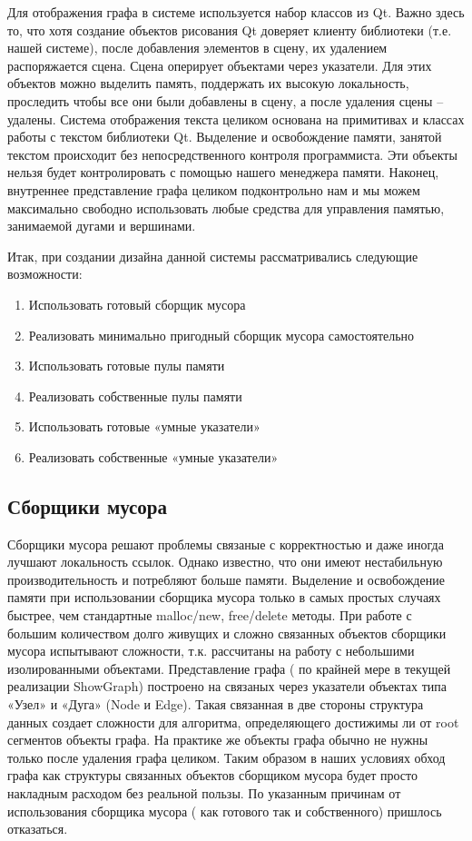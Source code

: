 \documentclass{article}
\begin{document}
Для отображения графа в системе используется набор классов из Qt. Важно здесь то, что хотя создание объектов рисования Qt доверяет клиенту библиотеки (т.е. нашей системе), после добавления элементов в сцену, их удалением распоряжается сцена. Сцена оперирует объектами через указатели. Для этих объектов можно выделить память, поддержать их высокую локальность, проследить чтобы все они были добавлены в сцену, а после удаления сцены -- удалены. Система отображения текста целиком основана на примитивах и классах работы с текстом библиотеки Qt. Выделение и освобождение памяти, занятой текстом происходит без непосредственного контроля программиста. Эти объекты нельзя будет контролировать с помощью нашего менеджера памяти. Наконец, внутреннее представление графа целиком подконтрольно нам и мы можем максимально свободно использовать любые средства для управления памятью, занимаемой дугами и вершинами.

Итак, при создании дизайна данной системы рассматривались следующие возможности:
\begin{enumerate}
\item  Использовать готовый сборщик мусора

\item  Реализовать минимально пригодный сборщик мусора самостоятельно

\item  Использовать готовые пулы памяти

\item  Реализовать собственные пулы памяти

\item  Использовать готовые «умные указатели»

\item  Реализовать собственные «умные указатели»
\end{enumerate}

\subsection{Сборщики мусора}

 Сборщики мусора решают проблемы связаные с корректностью и даже иногда лучшают локальность ссылок. Однако известно, что они имеют нестабильную производительность и потребляют больше памяти. Выделение и освобождение памяти при использовании сборщика мусора только в самых простых случаях быстрее, чем стандартные malloc/new, free/delete методы. При работе с большим количеством долго живущих и сложно связанных объектов сборщики мусора испытывают сложности, т.к. рассчитаны на работу с небольшими изолированными объектами. Представление графа ( по крайней мере в текущей реализации ShowGraph) построено на связаных через указатели объектах типа «Узел» и «Дуга» (Node и Edge). Такая связанная в две стороны структура данных создает сложности для алгоритма, определяющего достижимы ли от root сегментов объекты графа. На практике же объекты графа обычно не нужны только после удаления графа целиком. Таким образом в наших условиях обход графа как структуры связанных объектов сборщиком мусора будет просто накладным расходом без реальной пользы. По указанным причинам от использования сборщика мусора ( как готового так и собственного) пришлось отказаться.
\end{document}
